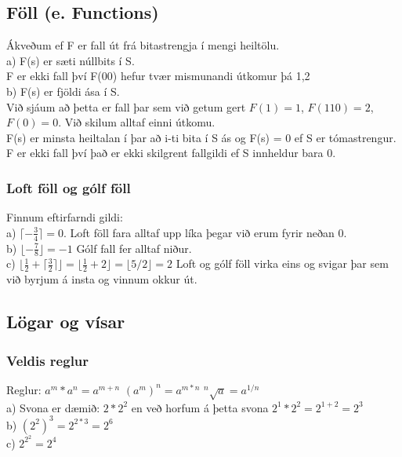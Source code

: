 \subsection{Föll (e. Functions)}
Ákveðum ef F er fall út frá bitastrengja í mengi heiltölu.\\
\hspace*{1em}a) F(s) er sæti núllbits í S.\\
\hspace*{1em}F er ekki fall því F(00) hefur tvær mismunandi útkomur þá 1,2\\
\hspace*{1em}b) F(s) er fjöldi ása í S. \\
\hspace*{1em}Við sjáum að þetta er fall þar sem við getum gert $F(1) = 1$, $F(110) = 2$, \hspace*{1em}$F(0) = 0$. Við skilum alltaf einni útkomu.\\
\hspace*{1em}F(s) er minsta heiltalan í þar að i-ti bita í S ás og F(s) = 0 ef S er tómastrengur.\\
\hspace*{1em}F er ekki fall því það er ekki skilgrent fallgildi ef S innheldur bara 0.\\

\subsubsection{Loft föll og gólf föll}
Finnum eftirfarndi gildi:\\
\hspace*{1em}a) $\lceil - \frac{3}{4} \rceil = 0$. Loft föll fara alltaf upp líka þegar við erum fyrir neðan 0.\\
\hspace*{1em}b) $\lfloor - \frac{7}{8} \rfloor = -1$ Gólf fall fer alltaf niður.\\
\hspace*{1em}c) $\lfloor \frac{1}{2} + \lceil \frac{3}{2} \rceil  \rfloor = \lfloor \frac{1}{2} + 2 \rfloor = \lfloor 5/2 \rfloor = 2$ Loft og gólf föll virka eins og svigar þar \hspace*{1em}sem við byrjum á insta og vinnum okkur út.\\
\newpage

\subsection*{Lögar og vísar}
\subsubsection*{Veldis reglur}
Reglur: $a^m * a^n = a^{m+n}$ \quad $(a^m)^n = a^{m*n}$ \quad $^n\sqrt{a} = a^{1/n}$\\
a) Svona er dæmið: $2*2^2$ en veð horfum á þetta svona $2^1*2^2 = 2^{1+2} = 2^3$\\
b) $(2^2)^3 = 2^{2*3} = 2^6$\\
c) $2^{2^2} = 2^4$
